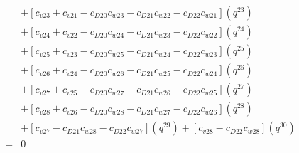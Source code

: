 \documentclass[12pt]{article}
\begin{document}
\begin{align}
    &+ [c_{v23} + c_{v21} - c_{D20}c_{w23} - c_{D21}c_{w22} - c_{D22}c_{w21}](q^{23}) \nonumber\\
    &+ [c_{v24} + c_{v22} - c_{D20}c_{w24} - c_{D21}c_{w23} - c_{D22}c_{w22}](q^{24}) \nonumber\\
    &+ [c_{v25} + c_{v23} - c_{D20}c_{w25} - c_{D21}c_{w24} - c_{D22}c_{w23}](q^{25}) \nonumber\\
    &+ [c_{v26} + c_{v24} - c_{D20}c_{w26} - c_{D21}c_{w25} - c_{D22}c_{w24}](q^{26}) \nonumber\\
    &+ [c_{v27} + c_{v25} - c_{D20}c_{w27} - c_{D21}c_{w26} - c_{D22}c_{w25}](q^{27}) \nonumber\\
    &+ [c_{v28} + c_{v26} - c_{D20}c_{w28} - c_{D21}c_{w27} - c_{D22}c_{w26}](q^{28}) \nonumber\\
    &+ [c_{v27} - c_{D21}c_{w28} - c_{D22}c_{w27}](q^{29}) + [c_{v28} - c_{D22}c_{w28}](q^{30}) \nonumber\\
    =& 0
\end{align}
\end{document}
